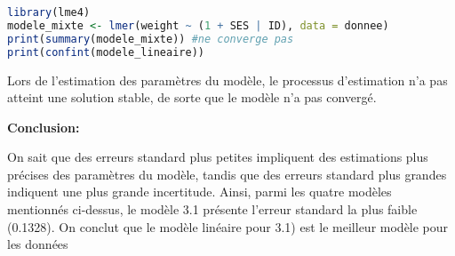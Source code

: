 \documentclass[12pt,a4paper]{article}
\begin{document}
\begin{lstlisting}[language=R]
library(lme4)
modele_mixte <- lmer(weight ~ (1 + SES | ID), data = donnee)
print(summary(modele_mixte)) #ne converge pas
print(confint(modele_lineaire))
\end{lstlisting}

Lors de l'estimation des paramètres du modèle, le processus d'estimation n'a pas atteint une solution stable, de sorte que le modèle n'a pas convergé.

\textbf{Conclusion:}

On sait que des erreurs standard plus petites impliquent des estimations plus précises des paramètres du modèle, tandis que des erreurs standard plus grandes indiquent une plus grande incertitude. Ainsi, parmi les quatre modèles mentionnés ci-dessus, le modèle 3.1 présente l'erreur standard la plus faible (0.1328).
On conclut que le modèle linéaire pour 3.1) est le meilleur modèle pour les données
\end{document}
